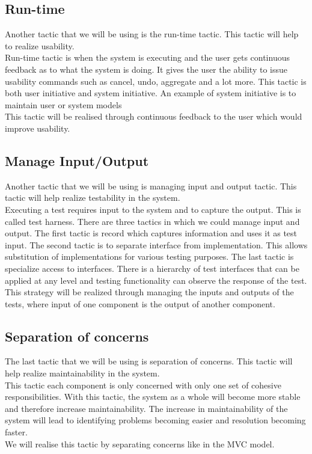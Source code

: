 \documentclass[a4paper]{article}
\begin{document}
\subsection{Run-time}
Another tactic that we will be using is the run-time tactic. This tactic will help to realize usability.
\\Run-time tactic is when the system is executing and the user gets continuous feedback as to what the system is doing. It gives the user the ability to issue usability commands such as cancel, undo, aggregate and a lot more.  This tactic is both user initiative and system initiative. An example of system initiative is to maintain user or system models
\\This tactic will be realised through continuous feedback to the user which would improve usability.

\subsection{Manage Input/Output}
Another tactic that we will be using is managing input and output tactic. This tactic will help realize testability in the system. 
\\Executing a test requires input to the system and to capture the output. This is called test harness. There are three tactics in which we could manage input and output. The first tactic is record which captures information and uses it as test input. The second tactic is to separate interface from implementation. This allows substitution of implementations for various testing purposes. The last tactic is specialize access to interfaces. There is a hierarchy of test interfaces that can be applied at any level and testing functionality can observe the response of the test.
\\This strategy will be realized through managing the inputs and outputs of the tests, where input of one component is the output of another component.

\subsection{Separation of concerns}
The last tactic that we will be using is separation of concerns. This tactic will help realize maintainability in the system. 
\\This tactic each component is only concerned with only one set of cohesive responsibilities. With this tactic, the system as a whole will become more stable and therefore increase maintainability. The increase in maintainability of the system will lead to identifying problems becoming easier and resolution becoming faster.
\\We will realise this tactic by separating concerns like in the MVC model.
\end{document}

